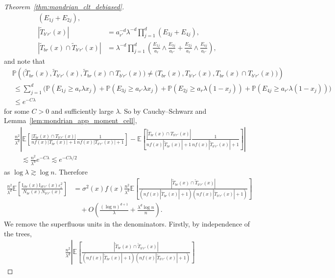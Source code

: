 \documentclass[11pt,lof]{puthesis}
\renewcommand{\P}{\ensuremath{\mathbb{P}}}
\newcommand{\E}{\ensuremath{\mathbb{E}}}
\newcommand{\I}{\ensuremath{\mathbb{I}}}
\theoremstyle{break}
\theoremstyle{proof}
\newtheorem{proof}{Proof}
\begin{document}
\begin{proof}[Theorem~\ref{thm:mondrian_clt_debiased}]
\begin{align*}
\left( E_{1j} + E_{2j} \right), \\
|\tilde T_{b' r'}(x)|
&=
a_{r'}^{-d}
\lambda^{-d}
\prod_{j=1}^{d}
\left( E_{3j} + E_{4j} \right), \\
|\tilde T_{b r}(x) \cap \tilde T_{b' r'}(x)|
&=
\lambda^{-d}
\prod_{j=1}^{d}
\left(
\frac{E_{1j}}{a_r}
\wedge
\frac{E_{3j}}{a_{r'}}
+ \frac{E_{2j}}{a_r}
\wedge
\frac{E_{4j}}{a_{r'}}
\right),
\end{align*}
%
and note that
%
\begin{align*}
&\P \left(
\big( \tilde T_{b r}(x), \tilde T_{b' r'}(x),
\tilde T_{b r}(x) \cap T_{b' r'}(x) \big)
\neq
\big( T_{b r}(x), T_{b' r'}(x), T_{b r}(x) \cap T_{b' r'}(x) \big)
\right) \\
&\,\leq
\sum_{j=1}^{d}
\big(
\P(E_{1j} \geq a_r \lambda x_j)
+ \P(E_{3j} \geq a_{r'} \lambda x_j)
+ \P(E_{2j} \geq a_r \lambda (1 - x_j))
+ \P(E_{4j} \geq a_{r'} \lambda (1 - x_j))
\big) \\
&\,\leq e^{-C \lambda}
\end{align*}
%
for some $C > 0$ and sufficiently large $\lambda$.
So by Cauchy--Schwarz and Lemma~\ref{lem:mondrian_app_moment_cell},
%
\begin{align*}
&
\frac{n^2}{\lambda^d}
\left|
\E \left[
\frac{|T_{b r}(x) \cap T_{b' r'}(x)|}
{n f(x) |T_{b r}(x)|+1}
\frac{1}
{n f(x) |T_{b' r'}(x)|+1}
\right]
- \E \left[
\frac{|\tilde T_{b r}(x) \cap T_{b' r'}(x)|}
{n f(x) |\tilde T_{b r}(x)|+1}
\frac{1}
{n f(x) |\tilde T_{b' r'}(x)|+1}
\right]
\right| \\
&\quad\lesssim
\frac{n^2}{\lambda^d}
e^{-C \lambda}
\lesssim
e^{-C \lambda / 2}
\end{align*}
%
as $\log \lambda \gtrsim \log n$.
Therefore
%
\begin{align*}
\frac{n^2}{\lambda^d}
\E \left[
\frac{\I_{i b r}(x) \I_{i b' r'}(x) \varepsilon_i^2}
{N_{b r}(x) N_{b' r'}(x)}
\right]
&=
\sigma^2(x)
f(x)
\frac{n^2}{\lambda^d}
\E \left[
\frac{|\tilde T_{b r}(x) \cap \tilde T_{b' r'}(x)|}
{(n f(x) |\tilde T_{b r}(x)|+1)(n f(x) |\tilde T_{b' r'}(x)|+1)}
\right] \\
&\quad+
O \left(
\frac{(\log n)^{d+1}}{\lambda}
+ \frac{\lambda^d \log n}{n}
\right).
\end{align*}
%
We remove the superfluous units in the denominators.
Firstly, by independence of the trees,
%
\begin{align*}
& \frac{n^2}{\lambda^d}
\left|
\E \left[
\frac{|\tilde T_{b r}(x) \cap \tilde T_{b' r'}(x)|}
{(n f(x) |\tilde T_{b r}(x)|+1)(n f(x) |\tilde T_{b' r'}(x)|+1)}
\right]

\end{align*}
\end{proof}
\end{document}

